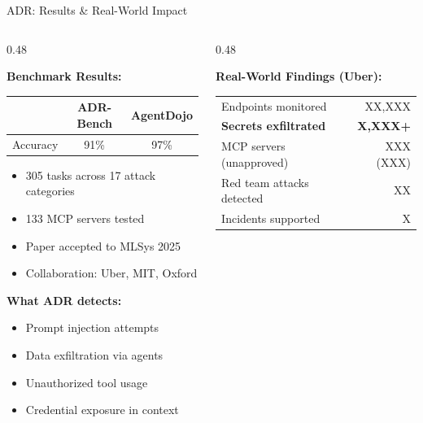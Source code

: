 \documentclass[aspectratio=169,9pt]{beamer}
\begin{document}
\begin{frame}{ADR: Results \& Real-World Impact}

\begin{columns}[T]
\begin{column}{0.48\textwidth}
\begin{greenbox}
\textbf{Benchmark Results:}\\[0.3em]
\scriptsize
\begin{tabular}{l|c|c}
& \textbf{ADR-Bench} & \textbf{AgentDojo} \\
\hline
Accuracy & 91\% & 97\% \\
\end{tabular}

\vspace{0.3em}
\begin{itemize}\scriptsize
  \item 305 tasks across 17 attack categories
  \item 133 MCP servers tested
  \item Paper accepted to MLSys 2025
  \item Collaboration: Uber, MIT, Oxford
\end{itemize}
\end{greenbox}

\vspace{0.3em}
\textbf{What ADR detects:}
\begin{itemize}\scriptsize
  \item Prompt injection attempts
  \item Data exfiltration via agents
  \item Unauthorized tool usage
  \item Credential exposure in context
\end{itemize}
\end{column}

\begin{column}{0.48\textwidth}
\begin{redbox}
\textbf{Real-World Findings (Uber):}\\[0.3em]
\scriptsize
\begin{tabular}{p{3.2cm}r}
Endpoints monitored & XX,XXX \\
\textbf{Secrets exfiltrated} & \textbf{X,XXX+} \\
MCP servers (unapproved) & XXX (XXX) \\
Red team attacks detected & XX \\
Incidents supported & X \\
\end{tabular}
\end{redbox}


\end{column}
\end{columns}
\end{frame}
\end{document}
